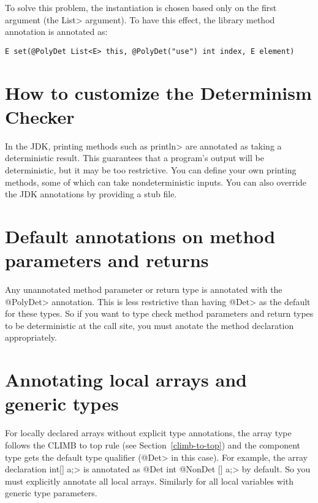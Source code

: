 To solve this problem, the instantiation is chosen based only on the first
argument (the \<List> argument).  To have this effect, the library method
annotation is annotated as:

\begin{Verbatim}
E set(@PolyDet List<E> this, @PolyDet("use") int index, E element)
\end{Verbatim}



\section{How to customize the Determinism Checker\label{determinism-customization}}

In the JDK, printing methods such as \<println> are annotated as taking a
deterministic result.  This guarantees that a program's output will be
deterministic, but it may be too restrictive.  You can define your own
printing methods, some of which can take nondeterministic inputs.  You can
also override the JDK annotations by providing a stub file.

\section{Default annotations on method parameters and returns\label{determinism-param-default}}

Any unannotated method parameter or return type is annotated with the \<@PolyDet> annotation.
This is less restrictive than having \<@Det> as the default for these types. So if you
want to type check method parameters and return types to be deterministic at the call site, you
must anotate the method declaration appropriately.

\section{Annotating local arrays and generic types\label{determinism-local-arrays}}

For locally declared arrays without explicit type annotations, the array type follows the CLIMB to top rule (see Section~\ref{climb-to-top}) and
the component type gets the default type qualifier (\<@Det> in this case).
For example, the array declaration \<int[] a;> is annotated as \<@Det int @NonDet [] a;> by default.
So you must explicitly annotate all local arrays.
Similarly for all local variables with generic type parameters.


